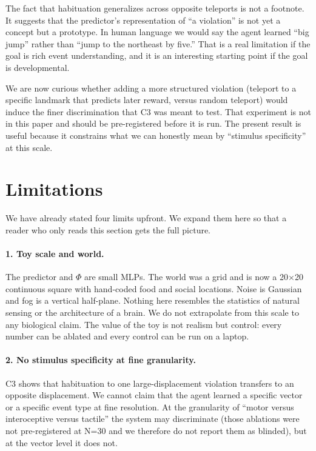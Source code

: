 \documentclass[11pt,a4paper]{article}
\begin{document}
The fact that habituation generalizes across opposite teleports is not a footnote. It suggests that the predictor's representation of ``a violation'' is not yet a concept but a prototype. In human language we would say the agent learned ``big jump'' rather than ``jump to the northeast by five.'' That is a real limitation if the goal is rich event understanding, and it is an interesting starting point if the goal is developmental.

We are now curious whether adding a more structured violation (teleport to a specific landmark that predicts later reward, versus random teleport) would induce the finer discrimination that C3 was meant to test. That experiment is not in this paper and should be pre-registered before it is run. The present result is useful because it constrains what we can honestly mean by ``stimulus specificity'' at this scale.

\section{Limitations}
\label{sec:limitations}

We have already stated four limits upfront. We expand them here so that a reader who only reads this section gets the full picture.

\paragraph{1. Toy scale and world.} The predictor and $\Phi$ are small MLPs. The world was a grid and is now a 20$\times$20 continuous square with hand-coded food and social locations. Noise is Gaussian and fog is a vertical half-plane. Nothing here resembles the statistics of natural sensing or the architecture of a brain. We do not extrapolate from this scale to any biological claim. The value of the toy is not realism but control: every number can be ablated and every control can be run on a laptop.

\paragraph{2. No stimulus specificity at fine granularity.} C3 shows that habituation to one large-displacement violation transfers to an opposite displacement. We cannot claim that the agent learned a specific vector or a specific event type at fine resolution. At the granularity of ``motor versus interoceptive versus tactile'' the system may discriminate (those ablations were not pre-registered at N=30 and we therefore do not report them as blinded), but at the vector level it does not.
\end{document}
